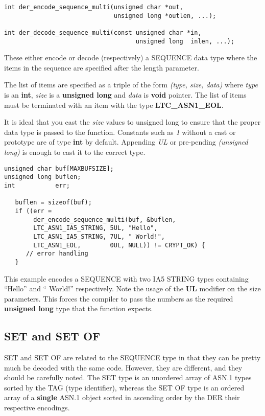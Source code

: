 \documentclass[synpaper]{book}
\begin{document}
\begin{verbatim}
int der_encode_sequence_multi(unsigned char *out,
                              unsigned long *outlen, ...);

int der_decode_sequence_multi(const unsigned char *in,
                                    unsigned long  inlen, ...);
\end{verbatim}

These either encode or decode (respectively) a SEQUENCE data type where the items in the sequence are specified after the length parameter.

The list of items are specified as a triple of the form \textit{(type, size, data)}  where \textit{type} is an \textbf{int}, \textit{size} is a \textbf{unsigned long}
and \textit{data} is \textbf{void} pointer.  The list of items must be terminated with an item with the type \textbf{LTC\_ASN1\_EOL}.

It is ideal that you cast the \textit{size} values to unsigned long to ensure that the proper data type is passed to the function.  Constants such as \textit{1} without
a cast or prototype are of type \textbf{int} by default.  Appending \textit{UL} or pre-pending \textit{(unsigned long)} is enough to cast it to the correct type.

\begin{small}
\begin{verbatim}
unsigned char buf[MAXBUFSIZE];
unsigned long buflen;
int           err;

   buflen = sizeof(buf);
   if ((err =
        der_encode_sequence_multi(buf, &buflen,
        LTC_ASN1_IA5_STRING, 5UL, "Hello",
        LTC_ASN1_IA5_STRING, 7UL, " World!",
        LTC_ASN1_EOL,        0UL, NULL)) != CRYPT_OK) {
      // error handling
   }
\end{verbatim}
\end{small}

This example encodes a SEQUENCE with two IA5 STRING types containing ``Hello'' and `` World!'' respectively.  Note the usage of the \textbf{UL} modifier
on the size parameters.  This forces the compiler to pass the numbers as the required \textbf{unsigned long} type that the function expects.

\subsection{SET and SET OF}

 
SET and SET OF are related to the SEQUENCE type in that they can be pretty much be decoded with the same code.  However, they are different, and they should
be carefully noted.  The SET type is an unordered array of ASN.1 types sorted by the TAG (type identifier), whereas the SET OF type is an ordered array of
a \textbf{single} ASN.1 object sorted in ascending order by the DER their respective encodings.
\end{document}
